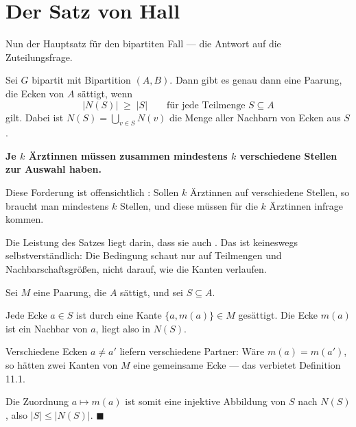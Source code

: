 \section{Der Satz von Hall}

Nun der Hauptsatz für den bipartiten Fall --- die Antwort auf die Zuteilungsfrage.

\begin{merksatz}
Sei $G$ bipartit mit Bipartition $(A,B)$. Dann gibt es genau dann eine Paarung, die  Ecken von $A$ sättigt, wenn
\[ |N(S)| \;\ge\; |S| \qquad \text{für jede Teilmenge } S \subseteq A \]
gilt. Dabei ist $N(S) = \bigcup_{v \in S} N(v)$ die Menge aller Nachbarn von Ecken aus $S$.
\end{merksatz}

\begin{merksatz}
\begin{center}
\begin{minipage}{0.9\textwidth}
\textbf{Je $k$ Ärztinnen müssen zusammen mindestens $k$ verschiedene Stellen zur Auswahl haben.}
\end{minipage}
\end{center}

Diese Forderung ist offensichtlich : Sollen $k$ Ärztinnen auf verschiedene Stellen, so braucht man mindestens $k$ Stellen, und diese müssen für die $k$ Ärztinnen infrage kommen.

Die Leistung des Satzes liegt darin, dass sie auch . Das ist keineswegs selbstverständlich: Die Bedingung schaut nur auf Teilmengen und Nachbarschaftsgrößen, nicht darauf, wie die Kanten verlaufen.
\end{merksatz}

\begin{merksatz}
Sei $M$ eine Paarung, die $A$ sättigt, und sei $S \subseteq A$.

Jede Ecke $a \in S$ ist durch eine Kante $\{a, m(a)\} \in M$ gesättigt. Die Ecke $m(a)$ ist ein Nachbar von $a$, liegt also in $N(S)$.

Verschiedene Ecken $a \neq a'$ liefern verschiedene Partner: Wäre $m(a) = m(a')$, so hätten zwei Kanten von $M$ eine gemeinsame Ecke --- das verbietet Definition 11.1.

Die Zuordnung $a \mapsto m(a)$ ist somit eine injektive Abbildung von $S$ nach $N(S)$, also $|S| \le |N(S)|$. $\blacksquare$
\end{merksatz}

